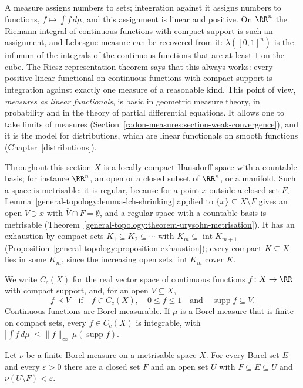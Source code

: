 A measure assigns numbers to sets; integration against it assigns numbers to functions, $f \mapsto \int f\,d\mu$, and this assignment is linear and positive. On $\RR^n$ the
Riemann integral of continuous functions with compact support is such an assignment, and Lebesgue measure can be recovered from it: $\lambda([0, 1]^n)$ is the infimum of the integrals of the
continuous functions that are at least $1$ on the cube. The Riesz representation theorem says that this always works: every positive linear functional on continuous functions with compact support
is integration against exactly one measure of a reasonable kind. This point of view, \emph{measures as linear functionals}, is basic in geometric measure theory, in probability and in the theory
of partial differential equations. It allows one to take limits of measures (Section~\ref{radon-measures:section-weak-convergence}), and it is the model for distributions, which are linear functionals on
smooth functions (Chapter~\ref{distributions}).

Throughout this section $X$ is a locally compact Hausdorff space with a countable basis; for instance $\RR^n$, an open or a closed subset of $\RR^n$, or a manifold. Such a space is metrisable: it is
regular, because for a point $x$ outside a closed set $F$, Lemma~\ref{general-topology:lemma-lch-shrinking} applied to $\{x\} \subseteq X \setminus F$ gives an open $V \ni x$ with
$\overline{V} \cap F = \emptyset$, and a regular space with a countable basis is metrisable (Theorem~\ref{general-topology:theorem-urysohn-metrisation}). It has an exhaustion by compact sets
$K_1 \subseteq K_2 \subseteq \cdots$ with $K_m \subseteq \operatorname{int}K_{m+1}$ (Proposition~\ref{general-topology:proposition-exhaustion}); every compact $K \subseteq X$ lies in some $K_m$, since the
increasing open sets $\operatorname{int}K_m$ cover $K$.

We write $C_c(X)$ for the real vector space of continuous functions $f \colon X \to \RR$ with compact support, and, for an open $V \subseteq X$,
\[
f \prec V \quad \text{if} \quad f \in C_c(X), \quad 0 \leq f \leq 1 \quad \text{and} \quad \operatorname{supp}f \subseteq V.
\]
Continuous functions are Borel measurable. If $\mu$ is a Borel measure that is finite on compact sets, every $f \in C_c(X)$ is integrable, with $|\int f\,d\mu| \leq \|f\|_\infty\,\mu(\operatorname{supp}f)$.

\begin{lemma}\label{radon-measures:lemma-closed-approximation}
Let $\nu$ be a finite Borel measure on a metrisable space $X$. For every Borel set $E$ and every $\varepsilon > 0$ there are a closed set $F$ and an open set $U$ with $F \subseteq E \subseteq U$ and
$\nu(U \setminus F) < \varepsilon$.
\end{lemma}


